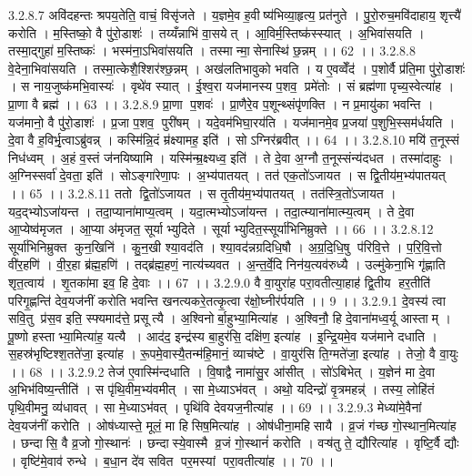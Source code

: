 3.2.8.7
अवि॑दहन्तः श्रपय॒तेति॒ वाचं॒ विसृ॑जते । य॒ज्ञमे॒व ह॒वीष्य॑भिव्या॒हृत्य॒ प्रत॑नुते । पु॒रो॒रुच॒मवि॑दाहाय॒ शृत्त्यै॑ करोति । म॒स्तिष्को॒ वै पु॑रो॒डाशः॑ । तय्यँन्नाभि॑ वा॒सयेत् । आ॒विर्म॒स्तिष्क॑स्स्यात् । अ॒भिवा॑सयति । तस्मा॒द्गुहा॑ म॒स्तिष्कः॑ । भस्म॑ना॒ऽभिवा॑सयति । तस्मान्मा॒॒सेनास्थि॑ छ॒न्नम् ।। 62 ।।
3.2.8.8
वे॒देना॒भिवा॑सयति । तस्मा॒त्केशै॒श्शिर॑श्छ॒न्नम् । अख॑लतिभावुको भवति । य ए॒वव्वेँद॑ । प॒शोर्वै प्र॑ति॒मा पु॑रो॒डाशः॑ । स नाय॒जुष्क॑मभि॒वास्यः॑ । वृथे॑व स्यात् । ई॒श्व॒रा यज॑मानस्य प॒शव॒ प्रमे॑तोः । सं ब्रह्म॑णा पृच्य॒स्वेत्या॑ह । प्रा॒णा वै ब्रह्म॑ ।। 63 ।।
3.2.8.9
प्रा॒णा प॒शवः॑ । प्रा॒णैरे॒व प॒शून्थ्संपृ॑णक्ति । न प्र॒मायु॑का भवन्ति । यज॑मानो॒ वै पु॑रो॒डाशः॑ । प्र॒जा प॒शव॒ पुरी॑षम् । यदे॒वम॑भिघा॒रय॑ति । यज॑मानमे॒व प्र॒जया॑ प॒शुभि॒स्सम॑र्धयति । दे॒वा वै ह॒विर्भृ॒त्वाऽब्रु॑वन्न् । कस्मि॑न्नि॒दं म्र॑क्ष्यामह॒ इति॑ । सोऽग्निर॑ब्रवीत् ।। 64 ।।
3.2.8.10
मयि॑ त॒नूस्सं निध॑ध्वम् । अ॒हं व॒स्तं ज॑नयिष्यामि । यस्मि॑न्म्र॒क्ष्यध्व॒ इति॑ । ते दे॒वा अ॒ग्नौ त॒नूस्संन्य॑दधत । तस्मा॑दाहुः । अ॒ग्निस्सर्वा॑ दे॒वता॒ इति॑ । सोऽङ्गा॑रेणा॒पः । अ॒भ्य॑पातयत् । तत॑ एक॒तो॑ऽजायत । स द्वि॒तीय॑म॒भ्य॑पातयत् ।। 65 ।।
3.2.8.11
ततो द्वि॒तो॑ऽजायत । स तृ॒तीय॑म॒भ्य॑पातयत् । तत॑स्त्रि॒तो॑ऽजायत । यद॒द्भ्योऽजा॑यन्त । तदा॒प्याना॑माप्य॒त्वम् । यदा॒त्मभ्योऽजा॑यन्त । तदा॒त्म्याना॑मात्म्य॒त्वम् । ते दे॒वा आ॒प्येष्व॑मृजत । आ॒प्या अ॑मृजत॒ सूर्याभ्युदिते । सूर्याभ्युदित॒स्सूर्या॑भिनिम्रुक्ते ।। 66 ।।
3.2.8.12
सूर्या॑भिनिम्रुक्त कुन॒खिनि॑ । कु॒न॒खी श्या॒वद॑ति । श्या॒वद॑न्नग्रदिधि॒षौ । अ॒ग्र॒दि॒धि॒षु प॑रिवि॒त्ते । प॒रि॒वि॒त्तो वी॑र॒हणि॑ । वी॒र॒हा ब्र॑ह्म॒हणि॑ । तद्ब्र॑ह्म॒हणं॒ नात्य॑च्यवत । अ॒न्त॒र्वे॒दि निन॑य॒त्यव॑रुध्यै । उल्मु॑केना॒भि गृ॑ह्णाति शृत॒त्वाय॑ । शृ॒तका॑मा इव॒ हि दे॒वाः ।। 67 ।।
3.2.9.0
वै वा॒युरा॑ह परा॒वतीत्या॒हाह॑ द्वि॒तीय॑ हर॒तीति॑ परिगृ॒ह्णन्ति॑ देव॒यज॑नीं करोति भवन्ति खनत्यकरे॒तत्कृ॒त्वा र॑क्षो॒घ्नीर॑र्पयति ।। 9 ।।
3.2.9.1
दे॒वस्य॑ त्वा सवि॒तु प्र॑स॒व इति॒ स्फ्यमाद॑त्ते॒ प्रसूत्यै । अ॒श्विनोर्बा॒हुभ्या॒मित्या॑ह । अ॒श्विनौ॒ हि दे॒वाना॑मध्व॒र्यू आस्ताम् । पू॒ष्णो हस्ताभ्या॒मित्या॑ह॒ यत्यै । आद॑द॒ इन्द्र॑स्य बा॒हुर॑सि॒ दक्षि॑ण॒ इत्या॑ह । इ॒न्द्रि॒यमे॒व यज॑माने दधाति । स॒हस्र॑भृष्टिश्श॒तते॑जा॒ इत्या॑ह । रू॒पमे॒वास्यै॒तन्म॑हि॒मानं॒ व्याच॑ष्टे । वा॒युर॑सि ति॒ग्मते॑जा॒ इत्या॑ह । तेजो॒ वै वा॒युः ।। 68 ।।
3.2.9.2
तेज॑ ए॒वास्मि॑न्दधाति । वि॒षाद्वै नामा॑सु॒र आ॑सीत् । सो॑ऽबिभेत् । य॒ज्ञेन॑ मा दे॒वा अ॒भिभ॑विष्य॒न्तीति॑ । स पृ॑थि॒वीम॒भ्य॑वमीत् । सा मे॒ध्याऽभ॑वत् । अथो॒ यदिन्द्रो॑ वृ॒त्रमहन्न्॑ । तस्य॒ लोहि॑तं पृथि॒वीमनु॒ व्य॑धावत् । सा मे॒ध्याऽभ॑वत् । पृथि॑वि देवयज॒नीत्या॑ह ।। 69 ।।
3.2.9.3
मेध्या॑मे॒वैनां देव॒यज॑नीं करोति । ओष॑ध्यास्ते॒ मूलं॒ मा हि॑सिष॒मित्या॑ह । ओष॑धीना॒महि॑सायै । व्र॒जं ग॑च्छ गो॒स्थान॒मित्या॑ह । छन्दा॑सि॒ वै व्र॒जो गो॒स्थानः॑ । छन्दा॑स्ये॒वास्मै व्र॒जं गो॒स्थानं॑ करोति । वऱ्ष॑तु ते॒ द्यौरित्या॑ह । वृष्टि॒र्वै द्यौः । वृष्टि॑मे॒वाव॑ रुन्धे । ब॒धा॒न दे॑व सवित पर॒मस्यां परा॒वतीत्या॑ह ।। 70 ।।

